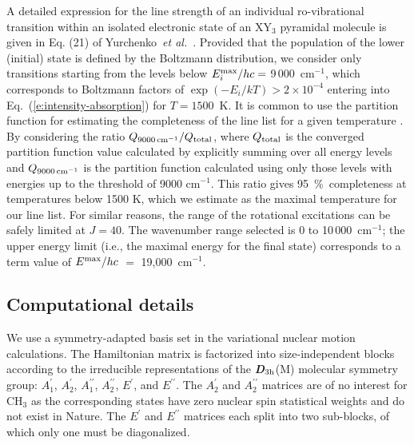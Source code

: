 \documentclass{achemso}
\renewcommand{\eqref}[1]{(\ref{#1})}
\newcommand{\3}{$_{3}$}
\newcommand{\cm}{cm$^{-1}$}
\newcommand{\p}{^\prime}
\newcommand{\pp}{^{\prime\prime}}
\begin{document}

A detailed expression for the line strength of an individual
ro-vibrational transition within an isolated electronic state
of an XY$_3$ pyramidal molecule is given in Eq. (21) of
Yurchenko~\textit{et al.}~\cite{dipole05}.
Provided that the population of the lower (initial) state is
defined by the Boltzmann distribution, we consider only transitions starting from the
levels below $E_{i}^{\rm max}/h c = $ 9\,000~\cm, which
corresponds to  Boltzmann factors of
$\exp(-E_i / k T) > 2\times 10^{-4}$ entering into Eq.~\eqref{e:intensity-absorption} for $T=1500$~K. It is common to use the partition function for estimating the completeness of the line list for a given temperature \cite{jt592}. By considering the ratio $Q_{9000\,{\rm cm}^{-1}}/Q_{\rm total}$, where $Q_{\rm total}$ is the converged partition function value calculated by explicitly summing over all energy levels and $Q_{9000\,{\rm cm}^{-1}}$ is the partition function calculated using only those levels with energies up to the threshold of 9000 \cm. This ratio gives 95~\%\ completeness
at temperatures below 1500 K, which we estimate  as the maximal temperature for our line list. For
similar reasons, the range of the rotational excitations can be
safely limited at $J=40$. The wavenumber range selected is 0 to 10\,000~\cm; the upper energy limit (i.e., the maximal energy for
the final state) corresponds to a term value of $E^{\rm max}/hc $ $=$ 19,000~\cm.

\subsection{ Computational details} \label{subs:Computational-details}
We use a symmetry-adapted basis set in the variational nuclear motion
calculations. The Hamiltonian matrix is factorized into
size-independent blocks according to the irreducible representations of the {\itshape\bfseries D}$_{3{\rm h}}$(M) molecular symmetry group:\cite{mss} $A_1\p$,
$A_2\p$, $A_1\pp$, $A_2\pp$, $E\p$, and $E\pp $. The
$A_2\p$ and $A_2\pp$ matrices are of no interest for CH\3 as the
corresponding states have zero nuclear spin statistical weights and do not exist in Nature.\cite{mss} %
The $E\p$ and $E\pp $ matrices each split into two sub-blocks, of which only one must be diagonalized.\cite{mss}
\end{document}
